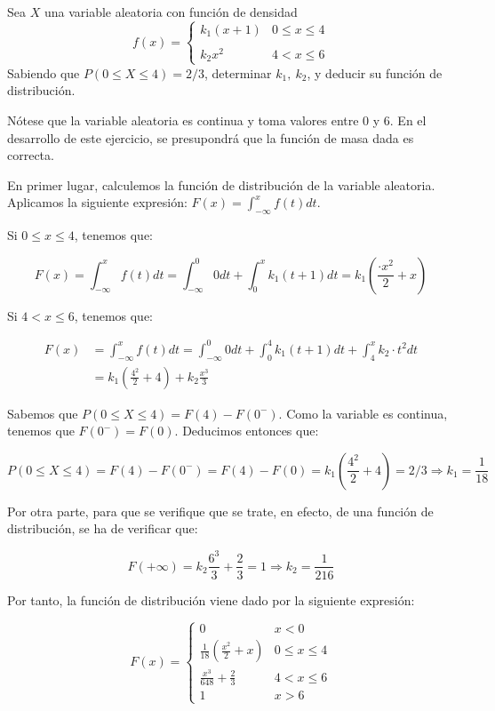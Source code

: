 \problem
Sea $X$ una variable aleatoria con funci{\'o}n de densidad
$$
f(x) = \left \{
\begin{array}{lc}
k_{1} (x+1) & 0 \leq x \leq 4 \\
\\ k_{2} x^{2} & 4 <x \leq 6
\end{array}
\right.
$$
Sabiendo que  $P(0 \leq X \leq 4) = 2/3$,  determinar $k_{1},\ k_{2}$, y
deducir su funci{\'o}n de distribuci{\'o}n.

Nótese que la variable aleatoria es continua y toma valores entre 0 y 6. En el desarrollo de este ejercicio, se presupondrá que la función de masa dada es correcta. 

En primer lugar, calculemos la función de distribución de la variable aleatoria. Aplicamos la siguiente expresión: $F(x) = \int_{-\infty}^x f(t) dt$. 

Si $0 \leq x \leq 4$, tenemos que: 

$$F(x) = \int_{-\infty}^x f(t) dt = \int_{-\infty}^0 0 dt + \int_0^x k_1(t+1)dt = k_1(\frac{·x^2}{2} + x)$$ 

Si $4 < x \leq 6$, tenemos que:

\begin{equation*}
\begin{split}
F(x) & = \int_{-\infty}^x f(t) dt = \int_{-\infty}^0 0 dt + \int_0^4 k_1(t+1)dt + \int_4^x k_2·t^2 dt \\
& = k_1(\frac{4^2}{2} + 4) + k_2\frac{x^3}{3} 
\end{split}
\end{equation*}

Sabemos que $P(0\leq X \leq 4) = F(4) - F(0^-)$. Como la variable es continua, tenemos que $F(0^-) = F(0)$. Deducimos entonces que: 

$$P(0 \leq X \leq 4) = F(4) - F(0^-) = F(4) - F(0) = k_1(\frac{4^2}{2} + 4) = 2/3 \Rightarrow k_1 = \frac{1}{18}$$

Por otra parte, para que se verifique que se trate, en efecto, de una función de distribución, se ha de verificar que: 

$$F(+\infty) = k_2\frac{6^3}{3} + \frac{2}{3} = 1 \Rightarrow k_2 = \frac{1}{216}$$

Por tanto, la función de distribución viene dado por la siguiente expresión: 

\begin{equation*}
	F(x) = \left \{
	\begin{array}{lcc}
	0 & x < 0 \\
	\frac{1}{18}(\frac{x^2}{2} + x) & 0 \leq x \leq 4 \\
	\frac{x^3}{648} + \frac{2}{3} & 4 <x \leq 6 \\
	1 & x > 6
	\end{array}
	\right.
\end{equation*}
